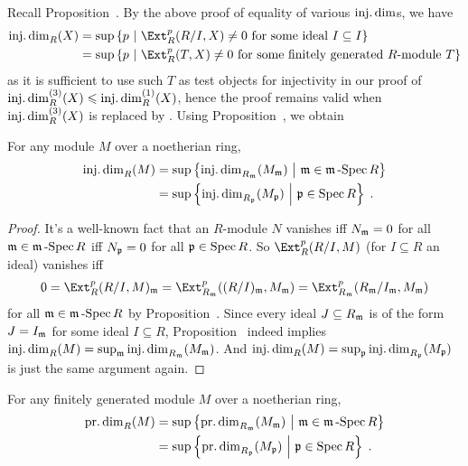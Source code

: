 \documentclass[a4paper,parskip=half,numbers=enddot, DIV=12]{scrreprt}
\renewcommand{\leq}{\leqslant}
\begin{document}
Recall Proposition~. By the above proof of equality of various $\operatorname{inj.dim}$s, we have
\begin{align}\lbl{eq:idim}
	\begin{split}
		\idim_R(X)&=\sup\left\{p\st\Ext_R^p(R/I,X)\neq 0\text{ for some ideal }I\subseteq I\right\}\\
		&=\sup\left\{p\st\Ext_R^p(T,X)\neq 0\text{ for some finitely generated }R\text{-module }T\right\}
	\end{split}
\end{align}
as it is sufficient to use such $T$ as test objects for injectivity in our proof of $\idim_R^{(3)}(X)\leq \idim_R^{(1)}(X)$, hence the proof remains valid when $\operatorname{inj.dim}_R^{(3)}(X)$ is replaced by . Using Proposition~, we obtain
\begin{cor}
	For any module $M$ over a noetherian ring,
	\begin{align*}
		\idim_R(M)&=\sup\left\{\idim_{R_\mm\vphantom{\pp}}(M_\mm)\st \mm\in\mSpec R\right\}\\
		&=\sup\left\{\idim_{R_\pp}(M_\pp)\st \pp\in\Spec R\right\}\;.
	\end{align*}
\end{cor}
\begin{proof}
	It's a well-known fact that an $R$-module $N$ vanishes iff $N_{\mathfrak{m}}=0$ for all $\mathfrak{m}\in\mathfrak{m}\operatorname{-Spec} R$ iff $N_{\mathfrak{p}}=0$ for all $\mathfrak{p}\in\operatorname{Spec} R$. So $\Ext_R^p(R/I,M)$ (for $I\subseteq R$ an ideal) vanishes iff
	\begin{align*}
		0=\Ext_R^p(R/I,M)_\mm=\Ext_{R_\mm}^p((R/I)_\mm,M_\mm)=\Ext_{R_\mm}^p(R_\mm/I_\mm,M_\mm)
	\end{align*}
	for all $\mathfrak{m}\in\mathfrak{m}\operatorname{-Spec} R$ by Proposition~. Since every ideal $J\subseteq R_{\mathfrak{m}}$ is of the form $J=I_{\mathfrak{m}}$ for some ideal $I\subseteq R$, Proposition~ indeed implies $\operatorname{inj.dim}_R(M)=\sup_{\mathfrak{m}}\operatorname{inj.dim}_{R_{\mathfrak{m}}}(M_{\mathfrak{m}})$. And $\operatorname{inj.dim}_R(M)=\sup_{\mathfrak{p}}\operatorname{inj.dim}_{R_{\mathfrak{p}}}(M_{\mathfrak{p}})$ is just the same argument again. 
\end{proof}
\begin{cor}
	For any finitely generated module $M$ over a noetherian ring,
	\begin{align*}
	\pdim_R(M)&=\sup\left\{\pdim_{R_\mm\vphantom{\pp}}(M_\mm)\st \mm\in\mSpec R\right\}\\
	&=\sup\left\{\pdim_{R_\pp}(M_\pp)\st \pp\in\Spec R\right\}\;.
	\end{align*}
\end{cor}
\end{document}
